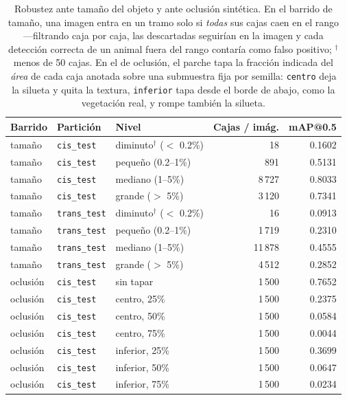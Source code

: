 \begin{table}[t]
  \centering
  \footnotesize
  \begin{tabular}{lllrr}
    \toprule
    Barrido & Partición & Nivel & Cajas / imág. & mAP@0.5 \\
    \midrule
    tamaño & \texttt{cis\_test} & diminuto$^{\dagger}$ ($<$ 0.2\%) & 18 & 0.1602 \\
    tamaño & \texttt{cis\_test} & pequeño (0.2--1\%) & 891 & 0.5131 \\
    tamaño & \texttt{cis\_test} & mediano (1--5\%) & 8\,727 & 0.8033 \\
    tamaño & \texttt{cis\_test} & grande ($>$ 5\%) & 3\,120 & 0.7341 \\
    tamaño & \texttt{trans\_test} & diminuto$^{\dagger}$ ($<$ 0.2\%) & 16 & 0.0913 \\
    tamaño & \texttt{trans\_test} & pequeño (0.2--1\%) & 1\,719 & 0.2310 \\
    tamaño & \texttt{trans\_test} & mediano (1--5\%) & 11\,878 & 0.4555 \\
    tamaño & \texttt{trans\_test} & grande ($>$ 5\%) & 4\,512 & 0.2852 \\
    oclusión & \texttt{cis\_test} & sin tapar & 1\,500 & 0.7652 \\
    oclusión & \texttt{cis\_test} & centro, 25\% & 1\,500 & 0.2375 \\
    oclusión & \texttt{cis\_test} & centro, 50\% & 1\,500 & 0.0584 \\
    oclusión & \texttt{cis\_test} & centro, 75\% & 1\,500 & 0.0044 \\
    oclusión & \texttt{cis\_test} & inferior, 25\% & 1\,500 & 0.3699 \\
    oclusión & \texttt{cis\_test} & inferior, 50\% & 1\,500 & 0.0647 \\
    oclusión & \texttt{cis\_test} & inferior, 75\% & 1\,500 & 0.0234 \\
    \bottomrule
  \end{tabular}
  \caption{Robustez ante tamaño del objeto y ante oclusión sintética. En el barrido de tamaño, una imagen entra en un tramo solo si \emph{todas} sus cajas caen en el rango —filtrando caja por caja, las descartadas seguirían en la imagen y cada detección correcta de un animal fuera del rango contaría como falso positivo; $^{\dagger}$ menos de 50 cajas. En el de oclusión, el parche tapa la fracción indicada del \emph{área} de cada caja anotada sobre una submuestra fija por semilla: \texttt{centro} deja la silueta y quita la textura, \texttt{inferior} tapa desde el borde de abajo, como la vegetación real, y rompe también la silueta.}
  \label{tab:robustez}
\end{table}
